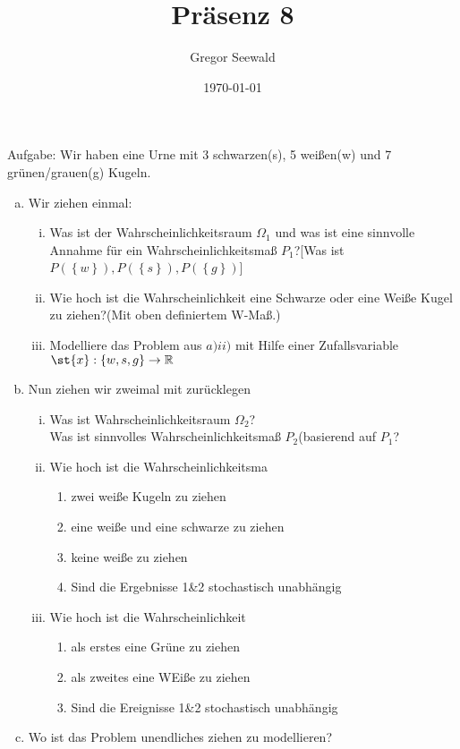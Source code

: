 \documentclass[11pt,a4paper]{article}
\title{Präsenz 8}
\author{Gregor Seewald}
\date{\today}
\begin{document}
\maketitle

  Aufgabe: Wir haben eine Urne mit 3 schwarzen(s), 5 weißen(w) und 7 grünen/grauen(g) Kugeln.\\
  \begin{enumerate}[a)]
    \item Wir ziehen einmal:
      \begin{enumerate}[i)]
        \item Was ist der Wahrscheinlichkeitsraum $\Omega_1$ und was ist eine sinnvolle Annahme für ein Wahrscheinlichkeitsmaß $P_1$?[Was ist $P(\left\lbrace w\right\rbrace),P(\left\lbrace s\right\rbrace),P(\left\lbrace g\right\rbrace)$]
        \item Wie hoch ist die Wahrscheinlichkeit eine Schwarze oder eine Weiße Kugel zu ziehen?(Mit oben definiertem W-Maß.)
        \item Modelliere das Problem aus $a)ii)$ mit Hilfe einer Zufallsvariable $\st{x}:\left\lbrace w,s,g\right\rbrace\to\mathbb{R}$
      \end{enumerate}
    \item Nun ziehen wir zweimal mit zurücklegen
      \begin{enumerate}[i)]
        \item Was ist Wahrscheinlichkeitsraum $\Omega_2$?\\
        Was ist sinnvolles Wahrscheinlichkeitsmaß $P_2$(basierend auf $P_1$?\\
        \item Wie hoch ist die Wahrscheinlichkeitsma
          \begin{enumerate}[1)]
            \item zwei weiße Kugeln zu ziehen
            \item eine weiße und eine schwarze zu ziehen
            \item keine weiße zu ziehen
            \item Sind die Ergebnisse 1&2 stochastisch unabhängig
          \end{enumerate}
        \item Wie hoch ist die Wahrscheinlichkeit
          \begin{enumerate}[1)]
            \item als erstes eine Grüne zu ziehen
            \item als zweites eine WEiße zu ziehen
            \item Sind die Ereignisse 1&2 stochastisch unabhängig
          \end{enumerate}
      \end{enumerate}
      \item Wo ist das Problem unendliches ziehen zu modellieren?
  \end{enumerate}
\end{document}
